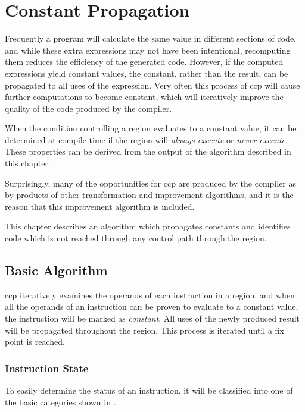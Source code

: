 \chapter{Constant Propagation}

Frequently a program will calculate the same value in different
sections of code, and while these extra expressions may not have been
intentional, recomputing them reduces the efficiency of the generated
code.  However, if the computed expressions yield constant values, the
constant, rather than the result, can be propagated to all uses of the
expression.  Very often this process of \ac{ccp} will cause further
computations to become constant, which will iteratively improve the
quality of the code produced by the compiler.

When the condition controlling a region evaluates to a constant value,
it can be determined at compile time if the region will \emph{always
  execute} or \emph{never execute}.  These properties can be derived
from the output of the algorithm described in this chapter.

Surprisingly, many of the opportunities for \ac{ccp} are produced by
the compiler as by-products of other transformation and improvement
algorithms, and it is the reason that this improvement algorithm is
included.

This chapter describes an algorithm which propagates constants and
identifies code which is not reached through any control path through
the region.

\section{Basic Algorithm}

\ac{ccp} iteratively examines the operands of each instruction in a
region, and when all the operands of an instruction can be proven to
evaluate to a constant value, the instruction will be marked as
\emph{constant}.  All uses of the newly produced result will be
propagated throughout the region.  This process is iterated until a
fix point is reached.

\subsection{Instruction State}\label{ccp:classification}

To easily determine the status of an instruction, it will be
classified into one of the basic categories shown in
.

